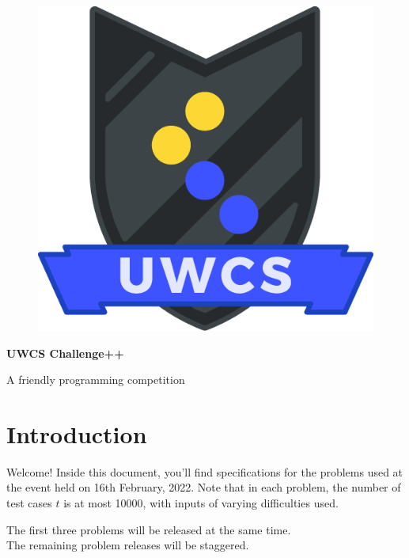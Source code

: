 \documentclass[a4paper,12pt,parskip=half-]{scrartcl}
\begin{document}
\begin{figure}
    \vspace{-10pt} %
    \includegraphics[width=0.8\linewidth]{shield.png} %
    \vspace{-100pt} %
\end{figure}

\normalfont \Huge \bfseries UWCS Challenge++

\normalfont\Large A friendly programming competition
\normalsize

\section*{Introduction}

Welcome! 
Inside this document, you'll find specifications for the problems used at the event held on 16th February, 2022. 
Note that in each problem, the number of test cases $t$ is at most 10000, with inputs of varying difficulties used.

The first three problems will be released at the same time.
\\ The remaining problem releases will be staggered.



\tableofcontents

\newpage



\newpage

\newpage

\newpage

\newpage

\newpage

\end{document}
